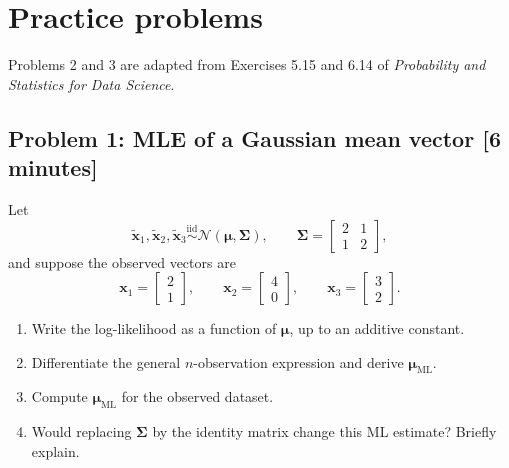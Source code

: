 \documentclass[11pt]{article}
\newcommand{\iid}{\mathrel{\overset{\mathrm{iid}}{\sim}}}
\newcommand{\ML}{\mathrm{ML}}
\newcommand{\rvv}[1]{\widetilde{\bm{#1}}}
\newcommand{\workingspace}[1]{}
\newcommand{\workingspace}[1]{\vspace{#1}}
\begin{document}
\newpage
\section*{Practice problems}

\noindent Problems 2 and 3 are adapted from Exercises 5.15 and 6.14 of
\emph{Probability and Statistics for Data Science}.

\subsection*{Problem 1: MLE of a Gaussian mean vector \hfill [6 minutes]}
Let
\[
  \rvv{x}_1,\rvv{x}_2,\rvv{x}_3
  \iid\mathcal N(\bm{\mu},\bm{\Sigma}),
  \qquad
  \bm{\Sigma}=\begin{bmatrix}2&1\\1&2\end{bmatrix},
\]
and suppose the observed vectors are
\[
  \bm{x}_1=\begin{bmatrix}2\\1\end{bmatrix},\qquad
  \bm{x}_2=\begin{bmatrix}4\\0\end{bmatrix},\qquad
  \bm{x}_3=\begin{bmatrix}3\\2\end{bmatrix}.
\]
\begin{enumerate}[label=(\alph*),itemsep=0.4em]
  \item Write the log-likelihood as a function of $\bm{\mu}$, up to an
        additive constant.
  \item Differentiate the general $n$-observation expression and derive
        $\bm{\mu}_{\ML}$.
  \item Compute $\bm{\mu}_{\ML}$ for the observed dataset.
  \item Would replacing $\bm{\Sigma}$ by the identity matrix change this ML
        estimate? Briefly explain.
\end{enumerate}
\workingspace{4.8cm}
\end{document}
